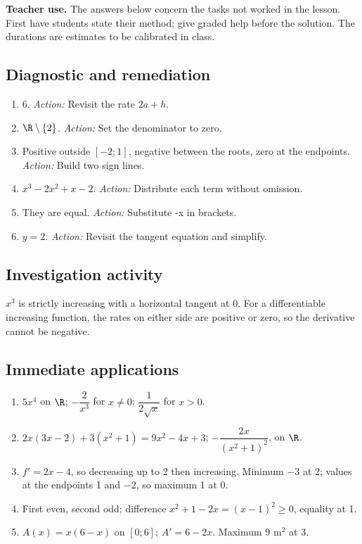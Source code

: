 \label{C06-CORR}
\textbf{Teacher use.} The answers below concern the tasks not worked in the lesson. First have students state their method; give graded help before the solution. The durations are estimates to be calibrated in class.
\subsection*{Diagnostic and remediation}
\begin{enumerate}
\item $6$. \textit{Action:} Revisit the rate $2a+h$.
\item $\R\setminus\{2\}$. \textit{Action:} Set the denominator to zero.
\item Positive outside $[-2;1]$, negative between the roots, zero at the endpoints. \textit{Action:} Build two sign lines.
\item $x^3-2x^2+x-2$. \textit{Action:} Distribute each term without omission.
\item They are equal. \textit{Action:} Substitute -x in brackets.
\item $y=2$. \textit{Action:} Revisit the tangent equation and simplify.
\end{enumerate}
\subsection*{Investigation activity}
$x^3$ is strictly increasing with a horizontal tangent at 0. For a differentiable increasing function, the rates on either side are positive or zero, so the derivative cannot be negative.
\subsection*{Immediate applications}
\begin{enumerate}
\item $5x^4$ on $\R$; $-\dfrac{2}{x^3}$ for $x\ne0$; $\dfrac{1}{2\sqrt x}$ for $x>0$.
\item $2x(3x-2)+3(x^2+1)=9x^2-4x+3$; $-\dfrac{2x}{(x^2+1)^2}$, on $\R$.
\item $f\prime=2x-4$, so decreasing up to 2 then increasing. Minimum $-3$ at 2; values at the endpoints 1 and $-2$, so maximum 1 at 0.
\item First even, second odd; difference $x^2+1-2x=(x-1)^2\geq0$, equality at 1.
\item $A(x)=x(6-x)$ on $[0;6]$; $A\prime=6-2x$. Maximum 9 m$^2$ at 3.
\end{enumerate}
